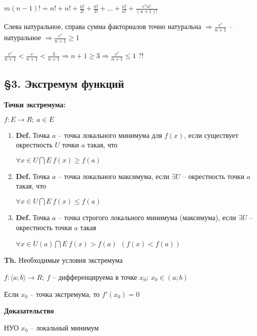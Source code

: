 \documentclass[14pt, letter paper]{article}
\newcommand{\q}[1]{\langle #1 \rangle}
\begin{document}
$m (n - 1)! = n! + n! + \frac{n!}{2!} + \frac{n!}{3!} + \ldots + \frac{n!}{n!} + \frac{e^c n!}{(n + 1)!}$

Слева натуральное, справа сумма факториалов точно натуральна $\Rightarrow \frac{e^c}{n + 1}$ -- натуральное $\Rightarrow \frac{e^c}{n + 1} \geq 1$

$\frac{e^c}{n + 1} < \frac{e}{n + 1} < \frac{3}{n + 1} \Rightarrow n + 1 \geq 3 \Rightarrow \frac{e^c}{n + 1} \leq 1$ ?!

\begin{center}
    \subsection*{\S 3. Экстремум функций}
\end{center}

\textbf{Точки экстремума:}

$f : E \rightarrow R;\ a \in E$

\begin{enumerate}
    \item \textbf{Def.} Точка $a$ -- точка локального минимума для $f(x)$, если существует окрестность $U$ точки $a$ такая, что 

    $\forall x \in U \bigcap E\ f(x) \geq f(a)$

    \item \textbf{Def.} Точка $a$ -- точка локального максимума, если $\exists U$ -- окрестность точки $a$ такая, что 

    $\forall x \in U \bigcap E\ f(x) \leq f(a)$

    \item \textbf{Def.} Точка $a$ -- точка строгого локального минимума (максимума), если $\exists U$ -- окрестность точки $a$ такая

    $\forall x \in \mathring{U}(a) \bigcap E\ f(x) > f(a)\ \ (f(x) < f(a))$
\end{enumerate}

\vspace{5mm}

\textbf{Th.} Необходимые условия экстремума

$f : \q{a; b} \rightarrow R;\ f$ -- дифференцируема в точке $x_0;\ x_0 \in (a; b)$

Если $x_0$ -- точка экстремума, то $f'(x_0) = 0$

\begin{center}
    \textbf{Доказательство}
\end{center}

НУО $x_0$ -- локальный минимум
\end{document}
